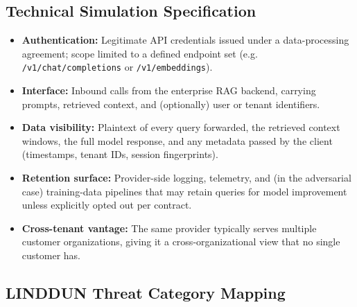 \documentclass[a4paper,12pt]{report}
\begin{document}
\subsection{Technical Simulation Specification}

\begin{prosebox}
\begin{itemize}[leftmargin=1.4em, itemsep=3pt]
  \item \textbf{Authentication:} Legitimate API credentials issued under a
        data-processing agreement; scope limited to a defined endpoint set
        (e.g. \texttt{/v1/chat/completions} or \texttt{/v1/embeddings}).
  \item \textbf{Interface:} Inbound calls from the enterprise RAG backend,
        carrying prompts, retrieved context, and (optionally) user or
        tenant identifiers.
  \item \textbf{Data visibility:} Plaintext of every query forwarded, the
        retrieved context windows, the full model response, and any
        metadata passed by the client (timestamps, tenant IDs, session
        fingerprints).
  \item \textbf{Retention surface:} Provider-side logging, telemetry, and
        (in the adversarial case) training-data pipelines that may
        retain queries for model improvement unless explicitly opted out
        per contract.
  \item \textbf{Cross-tenant vantage:} The same provider typically serves
        multiple customer organizations, giving it a cross-organizational
        view that no single customer has.
\end{itemize}
\end{prosebox}

\subsection{LINDDUN Threat Category Mapping}
\end{document}

